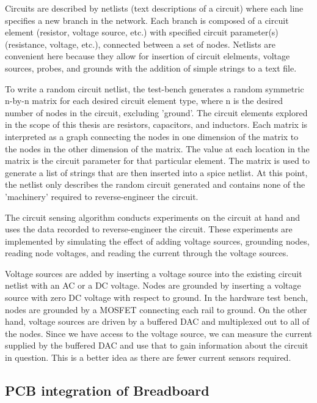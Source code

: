 \documentclass[11pt, a4paper]{article}
\begin{document}
Circuits are described by netlists (text descriptions of a circuit) where each line specifies a new branch in the network.
Each branch is composed of a circuit element (resistor, voltage source, etc.) with specified circuit parameter(s) (resistance, voltage, etc.), connected between a set of nodes.
Netlists are convenient here because they allow for insertion of circuit elelments, voltage sources, probes, and grounds with the addition of simple strings to a text file.

To write a random circuit netlist, the test-bench generates a random symmetric n-by-n matrix for each desired circuit element type, where n is the desired number of nodes in the circuit, excluding 'ground'.
The circuit elements explored in the scope of this thesis are resistors, capacitors, and inductors.
Each matrix is interpreted as a graph connecting the nodes in one dimension of the matrix to the nodes in the other dimension of the matrix.
The value at each location in the matrix is the circuit parameter for that particular element.  
The matrix is used to generate a list of strings that are then inserted into a spice netlist.
At this point, the netlist only describes the random circuit generated and contains none of the 'machinery' required to reverse-engineer the circuit.

The circuit sensing algorithm conducts experiments on the circuit at hand and uses the data recorded to reverse-engineer the circuit.
These experiments are implemented by simulating the effect of adding voltage sources, grounding nodes, reading node voltages, and reading the current through the voltage sources.

Voltage sources are added by inserting a voltage source into the existing circuit netlist with an AC or a DC voltage.
Nodes are grounded by inserting a voltage source with zero DC voltage with respect to ground.
In the hardware test bench, nodes are grounded by a MOSFET connecting each rail to ground.
On the other hand, voltage sources are driven by a buffered DAC and multiplexed out to all of the nodes.
Since we have access to the voltage source, we can measure the current supplied by the buffered DAC and use that to gain information about the circuit in question.
This is a better idea as there are fewer current sensors required.


\subsection{PCB integration of Breadboard}
\end{document}
